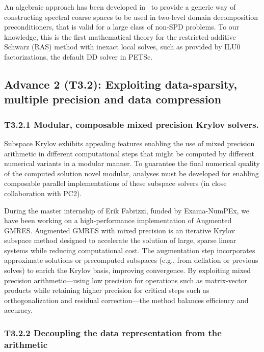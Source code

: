 An algebraic approach has been developed in~\cite{nataf:hal-04536547} to provide a generic way of constructing spectral coarse spaces to be used in two-level domain decomposition preconditioners, that is valid for a large class of non-SPD problems. To our knowledge, this is the first mathematical theory for the restricted additive Schwarz (RAS) method with inexact local solves, such as provided by ILU0 factorizations, the default DD solver in PETSc. 



 \subsection{  Advance 2 (T3.2): Exploiting data-sparsity, multiple precision and data compression}
\label{sec:wp3:T32}
 \subsubsection{ 
 T3.2.1 Modular, composable mixed precision Krylov solvers. 
 }
  Subspace Krylov exhibits appealing
features enabling the use of mixed precision arithmetic in different computational steps that might be
computed by different numerical variants in a modular manner. To guarantee the final numerical
quality of the computed solution novel modular, analyses must be developed for enabling composable
parallel implementations of these subspace solvers (in close collaboration with PC2).


During the master internship of Erik Fabrizzi, funded by Exama-NumPEx, we have been working on a high-performance implementation of Augmented GMRES. Augmented GMRES with mixed precision is an iterative Krylov subspace method designed to accelerate the solution of large, sparse linear systems while reducing computational cost. The augmentation step incorporates approximate solutions or precomputed subspaces (e.g., from deflation or previous solves) to enrich the Krylov basis, improving convergence. By exploiting mixed precision arithmetic—using low precision for operations such as matrix-vector products while retaining higher precision for critical steps such as orthogonalization and residual correction—the method balances efficiency and accuracy. 

 \subsubsection{ T3.2.2 Decoupling the data representation from the arithmetic}

